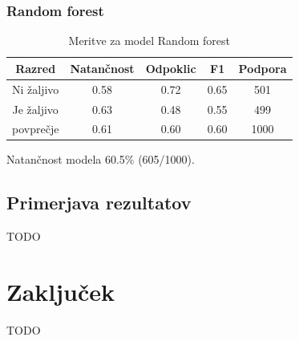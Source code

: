 \documentclass{acm_proc_article-sp}
\begin{document}
\subsubsection{Random forest}
\begin{table}[h!]
	\centering
	\caption{Meritve za model Random forest}
	\begin{tabular}{|c|c|c|c|c|}
		\hline
		\textbf{Razred} & \textbf{Natančnost} & \textbf{Odpoklic} & \textbf{F1} & \textbf{Podpora} \\ \hline
		Ni žaljivo & 0.58 & 0.72 & 0.65 & 501 \\ \hline
		Je žaljivo & 0.63 & 0.48 & 0.55 & 499 \\ \hline \hline
		povprečje & 0.61 & 0.60 & 0.60 & 1000 \\ \hline
	\end{tabular}
\end{table}
Natančnost modela 60.5\% (605/1000).

\subsection{Primerjava rezultatov}
TODO

\section{Zaključek}
TODO


 
\end{document}
